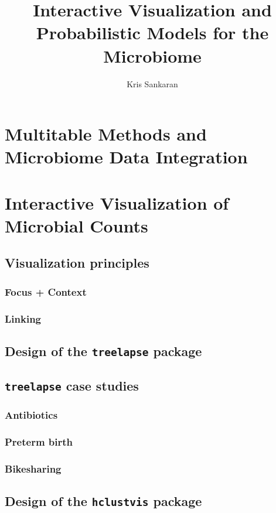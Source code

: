 \documentclass{report}
\title{Interactive Visualization and Probabilistic Models for the Microbiome}
\author{Kris Sankaran}
\begin{document}
\maketitle

\chapter{Multitable Methods and Microbiome Data Integration}

\chapter{Interactive Visualization of Microbial Counts}

\section{Visualization principles}

\subsection{Focus + Context}

\subsection{Linking}

\section{Design of the \texttt{treelapse} package}

\section{\texttt{treelapse} case studies}

\subsection{Antibiotics}

\subsection{Preterm birth}

\subsection{Bikesharing}

\section{Design of the \texttt{hclustvis} package}
\end{document}
